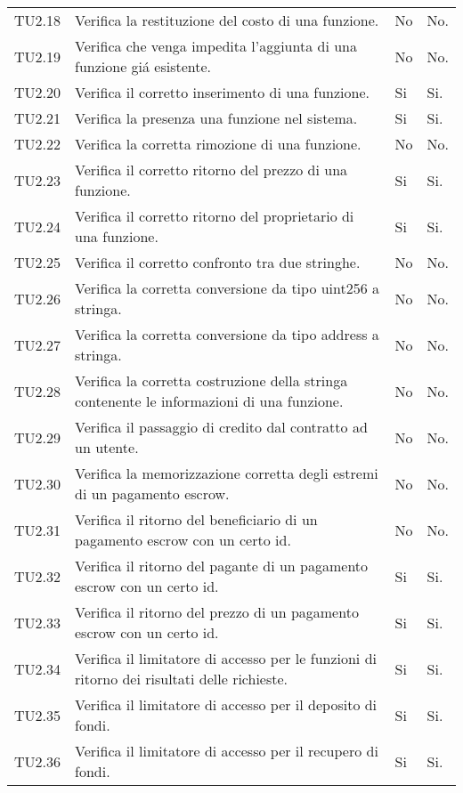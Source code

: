 \begin{longtable}{
		>{\centering}p{}
		>{}p{}
		>{\centering}p{}
		>{\centering}p{} }
TU2.18  &  Verifica la restituzione del costo di una funzione. &
No & No. \tabularnewline

TU2.19  &  Verifica che venga impedita l'aggiunta di una funzione giá esistente. &
No & No. \tabularnewline

TU2.20  &  Verifica il corretto inserimento di una funzione. &%
Si & Si. \tabularnewline

TU2.21  &  Verifica la presenza una funzione nel sistema.	&
Si & Si. \tabularnewline

TU2.22  &  Verifica la corretta rimozione di una funzione. &
No & No. \tabularnewline

TU2.23  &  Verifica il corretto ritorno del prezzo di una funzione. &
Si & Si. \tabularnewline

TU2.24  &  Verifica il corretto ritorno del proprietario di una funzione. &
Si & Si. \tabularnewline

TU2.25  &  Verifica il corretto confronto tra due stringhe. &
No & No. \tabularnewline

TU2.26  &  Verifica la corretta conversione da tipo uint256 a stringa. &
No & No. \tabularnewline

TU2.27  &  Verifica la corretta conversione da tipo address a stringa. &
No & No. \tabularnewline

TU2.28  &  Verifica la corretta costruzione della stringa contenente le informazioni di una funzione. &
No & No. \tabularnewline

TU2.29  &  Verifica il passaggio di credito dal contratto ad un utente. & %
No & No. \tabularnewline

TU2.30  &  Verifica la memorizzazione corretta degli estremi di un pagamento escrow. &
No & No. \tabularnewline

TU2.31  &  Verifica il ritorno del beneficiario di un pagamento escrow con un certo id. &
No & No. \tabularnewline

TU2.32  &  Verifica il ritorno del pagante di un pagamento escrow con un certo id.  &
Si & Si. \tabularnewline

TU2.33  &  Verifica il ritorno del prezzo di un pagamento escrow con un certo id.  &
Si & Si. \tabularnewline

TU2.34  &  Verifica il limitatore di accesso per le funzioni di ritorno dei risultati delle richieste.	&
Si & Si. \tabularnewline

TU2.35  &  Verifica il limitatore di accesso per il deposito di fondi.	&
Si & Si. \tabularnewline

TU2.36  &  Verifica il limitatore di accesso per il recupero di fondi.	&
Si & Si. \tabularnewline



\end{longtable}
